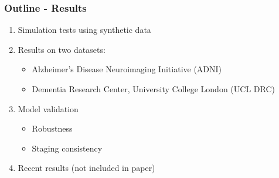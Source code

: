 \documentclass[8pt,xcolor=table]{beamer}
\begin{document}
\begin{frame}
\frametitle{Outline - Results}

\begin{enumerate}
  \item Simulation tests using synthetic data
  \vfill
  \item Results on two datasets:
  \begin{itemize}
   \item Alzheimer's Disease Neuroimaging Initiative (ADNI)
   \item Dementia Research Center, University College London (UCL DRC)
  \end{itemize}
  \vfill
  \item Model validation
  \begin{itemize}
   \item Robustness
   \item Staging consistency
  \end{itemize}

  \vfill
  \item Recent results (not included in paper)
\end{enumerate}

\end{frame}

    
\end{document}
